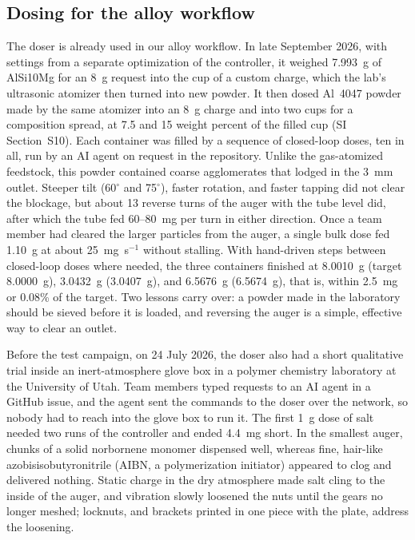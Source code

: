 \documentclass[twoside,twocolumn,9pt]{article}
\begin{document}
\subsection{Dosing for the alloy workflow}
\label{sec:alloy}

The doser is already used in our alloy workflow. In late September 2026, with settings from a separate optimization of the controller, it weighed 7.993~g of AlSi10Mg for an 8~g request into the cup of a custom charge, which the lab's ultrasonic atomizer then turned into new powder. It then dosed Al~4047 powder made by the same atomizer into an 8~g charge and into two cups for a composition spread, at 7.5 and 15 weight percent of the filled cup (SI Section~S10). Each container was filled by a sequence of closed-loop doses, ten in all, run by an AI agent on request in the repository. Unlike the gas-atomized feedstock, this powder contained coarse agglomerates that lodged in the 3~mm outlet. Steeper tilt (60$^\circ$ and 75$^\circ$), faster rotation, and faster tapping did not clear the blockage, but about 13 reverse turns of the auger with the tube level did, after which the tube fed 60--80~mg per turn in either direction. Once a team member had cleared the larger particles from the auger, a single bulk dose fed 1.10~g at about 25~mg~s$^{-1}$ without stalling. With hand-driven steps between closed-loop doses where needed, the three containers finished at 8.0010~g (target 8.0000~g), 3.0432~g (3.0407~g), and 6.5676~g (6.5674~g), that is, within 2.5~mg or 0.08\% of the target. Two lessons carry over: a powder made in the laboratory should be sieved before it is loaded, and reversing the auger is a simple, effective way to clear an outlet.

Before the test campaign, on 24 July 2026, the doser also had a short qualitative trial inside an inert-atmosphere glove box in a polymer chemistry laboratory at the University of Utah. Team members typed requests to an AI agent in a GitHub issue, and the agent sent the commands to the doser over the network, so nobody had to reach into the glove box to run it. The first 1~g dose of salt needed two runs of the controller and ended 4.4~mg short. In the smallest auger, chunks of a solid norbornene monomer dispensed well, whereas fine, hair-like azobisisobutyronitrile (AIBN, a polymerization initiator) appeared to clog and delivered nothing. Static charge in the dry atmosphere made salt cling to the inside of the auger, and vibration slowly loosened the nuts until the gears no longer meshed; locknuts, and brackets printed in one piece with the plate, address the loosening.
\end{document}
